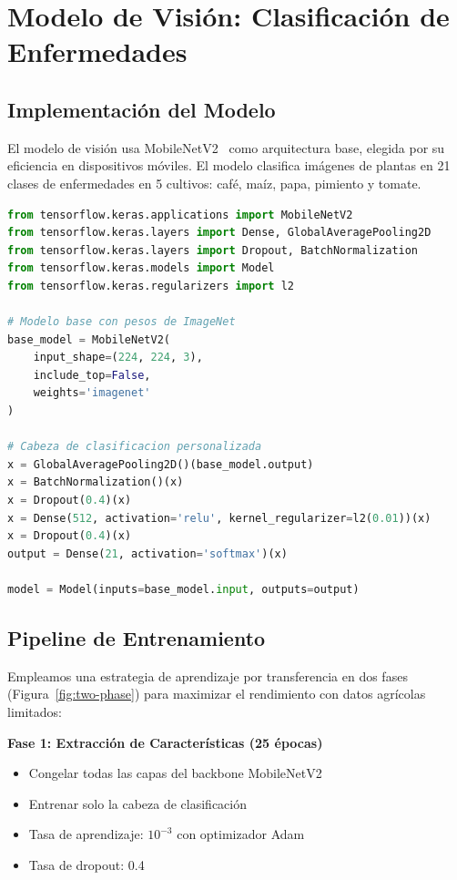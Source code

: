 \documentclass[11pt,a4paper]{article}
\begin{document}
\section{Modelo de Visión: Clasificación de Enfermedades}

\subsection{Implementación del Modelo}

El modelo de visión usa MobileNetV2~\cite{sandler2018mobilenetv2} como arquitectura base, elegida por su eficiencia en dispositivos móviles. El modelo clasifica imágenes de plantas en 21 clases de enfermedades en 5 cultivos: café, maíz, papa, pimiento y tomate.

\begin{lstlisting}[language=Python, caption={Arquitectura MobileNetV2 con cabeza de clasificación personalizada}]
from tensorflow.keras.applications import MobileNetV2
from tensorflow.keras.layers import Dense, GlobalAveragePooling2D
from tensorflow.keras.layers import Dropout, BatchNormalization
from tensorflow.keras.models import Model
from tensorflow.keras.regularizers import l2

# Modelo base con pesos de ImageNet
base_model = MobileNetV2(
    input_shape=(224, 224, 3),
    include_top=False,
    weights='imagenet'
)

# Cabeza de clasificacion personalizada
x = GlobalAveragePooling2D()(base_model.output)
x = BatchNormalization()(x)
x = Dropout(0.4)(x)
x = Dense(512, activation='relu', kernel_regularizer=l2(0.01))(x)
x = Dropout(0.4)(x)
output = Dense(21, activation='softmax')(x)

model = Model(inputs=base_model.input, outputs=output)
\end{lstlisting}

\subsection{Pipeline de Entrenamiento}

Empleamos una estrategia de aprendizaje por transferencia en dos fases (Figura~\ref{fig:two-phase}) para maximizar el rendimiento con datos agrícolas limitados:

\nopagebreak
\textbf{Fase 1: Extracción de Características (25 épocas)}
\begin{itemize}
    \item Congelar todas las capas del backbone MobileNetV2
    \item Entrenar solo la cabeza de clasificación
    \item Tasa de aprendizaje: $10^{-3}$ con optimizador Adam
    \item Tasa de dropout: 0.4
\end{itemize}
\end{document}
